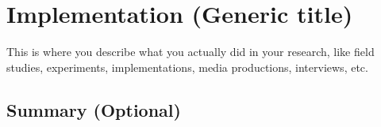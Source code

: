 \cleardoublepage
\chapter{Implementation (Generic title)}
\label{chap:implementation} 

This is where you describe what you actually did in your research, like field studies, experiments, implementations, media productions, interviews, etc.



\lipsum[81-99]

\section{Summary (Optional)}